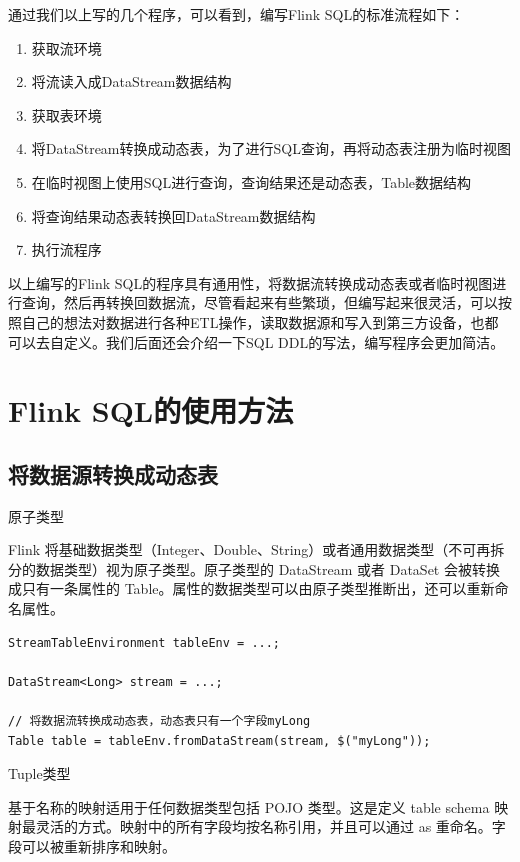 \documentclass[cn,11pt,chinese]{elegantbook}
\begin{document}
通过我们以上写的几个程序，可以看到，编写Flink SQL的标准流程如下：

\begin{enumerate}
    \item 获取流环境
    \item 将流读入成DataStream数据结构
    \item 获取表环境
    \item 将DataStream转换成动态表，为了进行SQL查询，再将动态表注册为临时视图
    \item 在临时视图上使用SQL进行查询，查询结果还是动态表，Table数据结构
    \item 将查询结果动态表转换回DataStream数据结构
    \item 执行流程序
\end{enumerate}

以上编写的Flink SQL的程序具有通用性，将数据流转换成动态表或者临时视图进行查询，然后再转换回数据流，尽管看起来有些繁琐，但编写起来很灵活，可以按照自己的想法对数据进行各种ETL操作，读取数据源和写入到第三方设备，也都可以去自定义。我们后面还会介绍一下SQL DDL的写法，编写程序会更加简洁。

\section{Flink SQL的使用方法}

\subsection{将数据源转换成动态表}

原子类型

Flink 将基础数据类型（Integer、Double、String）或者通用数据类型（不可再拆分的数据类型）视为原子类型。原子类型的 DataStream 或者 DataSet 会被转换成只有一条属性的 Table。属性的数据类型可以由原子类型推断出，还可以重新命名属性。

\begin{verbatim}
StreamTableEnvironment tableEnv = ...;

DataStream<Long> stream = ...;

// 将数据流转换成动态表，动态表只有一个字段myLong
Table table = tableEnv.fromDataStream(stream, $("myLong"));
\end{verbatim}

Tuple类型

基于名称的映射适用于任何数据类型包括 POJO 类型。这是定义 table schema 映射最灵活的方式。映射中的所有字段均按名称引用，并且可以通过 as 重命名。字段可以被重新排序和映射。
\end{document}
